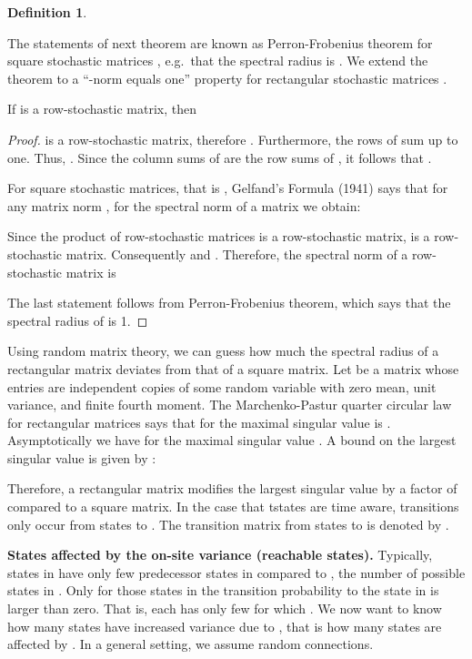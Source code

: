 \documentclass{article}
\newtheorem{definitionA}{Definition}
\begin{document}
\begin{appendices}
\begin{definitionA}
\end{definitionA}


The statements of next theorem are known as Perron-Frobenius theorem
for square stochastic matrices , e.g.\ that
the spectral radius  is .
We extend the theorem to a ``-norm equals one'' property for
rectangular stochastic matrices . 
\begin{lemmaA}
\label{th:Aperron}
If  is a row-stochastic matrix, then
 
\end{lemmaA}

\begin{proof}
 is a row-stochastic matrix, therefore
. Furthermore, the rows of  sum up
to one. Thus,  .
Since the column sums of  are the row sums of , it follows
that  .

For square stochastic matrices, that is ,
Gelfand's Formula (1941) says that
for any matrix norm , for the spectral norm
 of a matrix  we obtain:
 


Since the product of row-stochastic matrices is a row-stochastic
matrix,  is a row-stochastic matrix.
Consequently  and . 
Therefore, the spectral norm
 of a row-stochastic matrix 
is
 

The last statement follows from
Perron-Frobenius theorem, which says that the spectral radius of  is 1. 
\end{proof}

Using random matrix theory, we can guess how much the spectral radius
of a rectangular matrix deviates from that of a square matrix.
Let  be a matrix whose entries are independent copies of some random
variable with zero mean, unit variance, and finite fourth moment.
The Marchenko-Pastur quarter circular law for rectangular
matrices says that for  the maximal singular value
is  \cite{Marchenko:67}.
Asymptotically we have for the maximal
singular value  \cite{Rudelson:10}. 
A bound on the largest singular value is given by \cite{Soshnikov:02}:

Therefore, a rectangular matrix modifies the largest singular value by a factor of 
 compared to a  square matrix.
In the case that tstates are time aware, transitions only occur from
states  to . The transition matrix from
states  to  is denoted by .

{\bf States affected by the on-site variance  (reachable states).}
Typically,   states in  have only few predecessor states in
 compared to , the number of possible states in .
Only for those states in  the transition probability to the
state in  is larger than zero.
That is, each  has only few  for which
.
We now want to know how many states have increased variance due to
, that is how many states are affected by .
In a general setting, we assume random connections.


\end{appendices}
\end{document}
